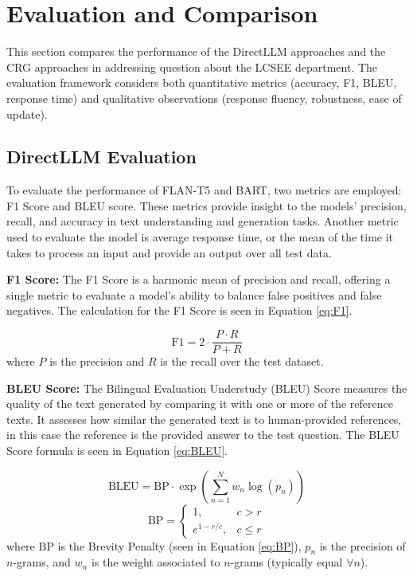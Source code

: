 \documentclass[conference]{IEEEtran}
\begin{document}
\section{Evaluation and Comparison} \label{sec:evaluation}
This section compares the performance of the DirectLLM approaches and the CRG approaches in addressing question about the LCSEE department.
The evaluation framework considers both quantitative metrics (accuracy, F1, BLEU, response time) and qualitative observations (response fluency, robustness, ease of update).
\subsection{DirectLLM Evaluation}
To evaluate the performance of FLAN-T5 and BART, two metrics are employed: F1 Score and BLEU score. 
These metrics provide insight to the models' precision, recall, and accuracy in text understanding and generation tasks.
Another metric used to evaluate the model is average response time, or the mean of the time it takes to process an input and provide an output over all test data.

\noindent
\textbf{F1 Score:}
The F1 Score is a harmonic mean of precision and recall, offering a single metric to evaluate a model's ability to balance false positives and false negatives.
The calculation for the F1 Score is seen in Equation \ref{eq:F1}.

\begin{equation} \label{eq:F1}
    \text{F1} = 2 \cdot \frac{P \cdot R}{P + R}
\end{equation}
where $P$ is the precision and $R$ is the recall over the test dataset. 

\noindent
\textbf{BLEU Score:}
The Bilingual Evaluation Understudy (BLEU) Score measures the quality of the text generated by comparing it with one or more of the reference texts.
It assesses how similar the generated text is to human-provided references, in this case the reference is the provided answer to the test question. 
The BLEU Score formula is seen in Equation \ref{eq:BLEU}.

\begin{equation} \label{eq:BLEU}
    \text{BLEU} = \text{BP} \cdot \exp \left( \sum_{n=1}^{N} w_n \log(p_n) \right)
\end{equation}
\begin{equation} \label{eq:BP}
    \text{BP} = 
    \begin{cases}
        1, & c > r \\
        e^{1 - r/c}, & c \leq r
    \end{cases}
\end{equation}
\noindent
where $\text{BP}$ is the Brevity Penalty (seen in Equation \ref{eq:BP}), $p_n$ is the precision of $n$-grams, and $w_n$ is the weight associated to $n$-grams (typically equal $\forall n$).
\end{document}
